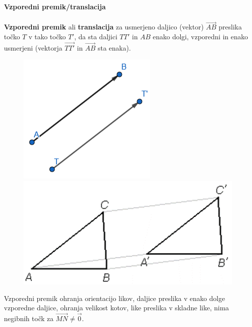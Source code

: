         \begin{frame}
            \large\textbf{Vzporedni premik/translacija}
            ~\\
            ~\\
            \normalsize
            \textbf{Vzporedni premik} ali \textbf{translacija} za usmerjeno daljico (vektor) $\overrightarrow{AB}$ preslika točko $T$ v tako točko $T'$, da sta daljici $TT'$ in $AB$ enako dolgi, vzporedni in enako usmerjeni (vektorja $\overrightarrow{TT'}$ in $\overrightarrow{AB}$ sta enaka). \\
            
            \begin{figure}
                \includegraphics[scale=0.5]{Slike in skice/Vzporedni_premik_tocke.png}
                \includegraphics[scale=0.5]{Slike in skice/Vzporedni_premik_trikotnika.png}
            \end{figure}

            Vzporedni premik ohranja orientacijo likov, daljice preslika v enako dolge vzporedne daljice, ohranja velikost kotov, like preslika v skladne like, nima negibnih točk za $\overrightarrow{MN}\neq \overrightarrow{0}$.

        \end{frame}

